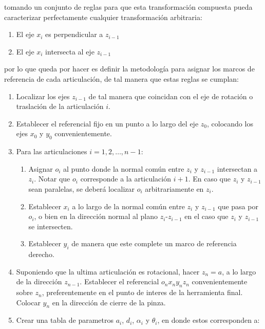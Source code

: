 \begin{multicols*}{3}
            tomando un conjunto de reglas para que esta transformación compuesta pueda caracterizar perfectamente cualquier transformación arbitraria:

            \begin{enumerate}
                \item El eje $x_i$ es perpendicular a $z_{i-1}$
                \item El eje $x_i$ intersecta al eje $z_{i-1}$
            \end{enumerate}

            por lo que queda por hacer es definir la metodología para asignar los marcos de referencia de cada articulación, de tal manera que estas reglas se cumplan:

            \begin{enumerate}
                \item Localizar los ejes $z_{i-1}$ de tal manera que coincidan con el eje de rotación o traslación de la articulación $i$.
                \item Establecer el referencial fijo en un punto a lo largo del eje $z_0$, colocando los ejes $x_0$ y $y_0$ convenientemente.
                \item Para las articulaciones $i = 1, 2, \dots, n-1$:
                \begin{enumerate}
                    \item Asignar $o_i$ al punto donde la normal común entre $z_i$ y $z_{i-1}$ intersectan a $z_i$. Notar que $o_i$ corresponde a la articulación $i+1$. En caso que $z_i$ y $z_{i-1}$ sean paralelas, se deberá localizar $o_i$ arbitrariamente en $z_i$.
                    \item Establecer $x_i$ a lo largo de la normal común entre $z_i$ y $z_{i-1}$ que pasa por $o_i$, o bien en la dirección normal al plano $z_i$-$z_{i-1}$ en el caso que $z_i$ y $z_{i-1}$ se intersecten.
                    \item Establecer $y_i$ de manera que este complete un marco de referencia derecho.
                \end{enumerate}
                \item Suponiendo que la ultima articulación es rotacional, hacer $z_n = a$, a lo largo de la dirección $z_{n-1}$. Establecer el referencial $o_n x_n y_n z_n$ convenientemente sobre $z_n$, preferentemente en el punto de interes de la herramienta final. Colocar $y_n$ en la dirección de cierre de la pinza.
                \item Crear una tabla de parametros $a_i$, $d_i$, $\alpha_i$ y $\theta_i$, en donde estos corresponden a:

\end{enumerate}
\end{multicols*}
